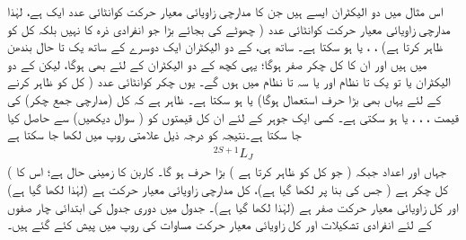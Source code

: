 اس مثال میں دو الیکٹران ایسے ہیں جن کا مدارچی زاویائی معیار حرکت کوانٹائی عدد ایک  ہے، لہٰذا مدارچی زاویائی معیار حرکت کوانٹائی عدد  ( چھوٹے  کی بجائے بڑا  جو انفرادی ذرہ کا نہیں بلکہ کل کو ظاہر کرتا ہے) ، ، یا  ہو سکتا ہے۔ ساتھ ہی،  کے دو الیکٹران ایک دوسرے کے ساتھ یک تا حال بندھن میں ہیں اور ان کا کل چکر صفر ہوگا؛ یہی کچھ  کے دو الیکٹران کے لئے بھی ہوگا، لیکن  کے دو الیکٹران یا تو یک تا نظام اور یا سہ تا نظام میں ہوں گے۔ یوں چکر کوانٹائی عدد ( کل کو ظاہر کرنے کے لئے یہاں بھی بڑا حرف استعمال ہوگا)  یا  ہو سکتا ہے۔ ظاہر ہے کہ  کل (مدارچی جمع چکر)  کی قیمت ، ، ، یا  ہو سکتی ہے۔ کسی ایک جوہر کے لئے ان کل قیمتوں کو  ( سوال  دیکھیں) سے حاصل کیا جا سکتا ہے۔نتیجہ کو درجہ ذیل علامتی روپ میں لکھا جا سکتا ہے
 \begin{align}\label{مساوات_متماثل_علامتی_لکھائی}
 ^{2S+1}L_{J}
 \end{align}
( جہاں  اور  اعداد جبکہ  ( جو کل کو ظاہر کرتا ہے ) بڑا حرف ہو گا۔ کاربن کا زمینی حال  ہے؛ اس کا کل چکر  ہے ( جس کی بنا پر  لکھا گیا ہے)، کل مدارچی زاویائی معیار حرکت  ہے (لہٰذا  لکھا گیا ہے) اور  کل زاویائی معیار حرکت صفر ہے (لہٰذا  لکھا گیا ہے)۔ جدول  میں دوری جدول کی ابتدائی چار صفوں کے لئے انفرادی تشکیلات اور کل زاویائی معیار حرکت مساوات  کی روپ میں پیش کئے گئے ہیں۔ 

